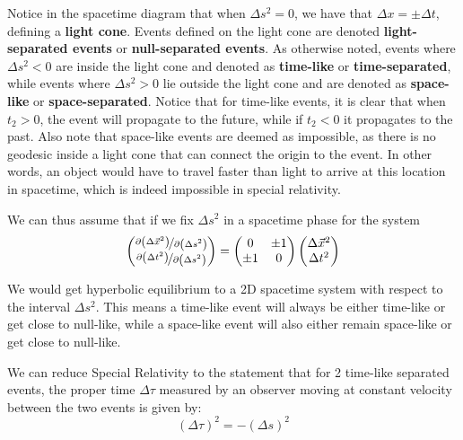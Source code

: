 \documentclass{article}
\begin{document}
 		Notice in the spacetime diagram that when $\Delta s^2 = 0$, we have that $\Delta x = \pm \Delta t$, defining a \textbf{light cone}. Events defined on the light cone are denoted \textbf{light-separated events} or \textbf{null-separated events}. As otherwise noted, events where $\Delta s^2 < 0 $ are inside the light cone and denoted as \textbf{time-like} or \textbf{time-separated}, while events where $\Delta s^2 > 0$ lie outside the light cone and are denoted as \textbf{space-like} or \textbf{space-separated}. Notice that for time-like events, it is clear that when $t_2 > 0$, the event will propagate to the future, while if $t_2 < 0$ it propagates to the past. Also note that space-like events are deemed as impossible, as there is no geodesic inside a light cone that can connect the origin to the event. In other words, an object would have to travel faster than light to arrive at this location in spacetime, which is indeed impossible in special relativity.
 		
 		We can thus assume that if we fix $\Delta s^2$ in a spacetime phase for the system
 		\vspace{0.5cm}
 		$$ \begin{pmatrix}
 			\nicefrac{\partial \left( \Delta \vec{x}^2 \right)}{\partial\left( \Delta s^2 \right)} \\
 			\nicefrac{\partial \left( \Delta t^2 \right)}{\partial\left( \Delta s^2 \right)}
 		\end{pmatrix}=\begin{pmatrix}
 			0 & \pm1 \\
 			\pm 1 & 0
 		\end{pmatrix} \begin{pmatrix}
 		\Delta \vec{x}^2 \\
 		\Delta t^2
 		\end{pmatrix}$$
 	
 		\pagebreak \noindent
 		We would get hyperbolic equilibrium to a 2D spacetime system with respect to the interval $\Delta s^2$. This means a time-like event will always be either time-like or get close to null-like, while a space-like event will also either remain space-like or get close to null-like. 
 	
 		\begin{claim}
 			We can reduce Special Relativity to the statement that for 2 time-like separated events, the proper time $\Delta \tau$ measured by an observer moving at constant velocity between the two events is given by:
 			$$ \left( \Delta \tau \right)^2  = - \left( \Delta s \right)^2$$
 		\end{claim}
 		
\end{document}
